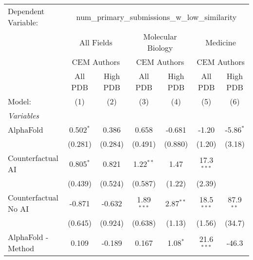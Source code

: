 \begingroup
\centering
\begin{tabular}{lcccccc}
   \tabularnewline \midrule \midrule
   Dependent Variable: & \multicolumn{6}{c}{num\_primary\_submissions\_w\_low\_similarity}\\
 & \multicolumn{2}{c}{All Fields} & \multicolumn{2}{c}{Molecular Biology} & \multicolumn{2}{c}{Medicine} \\
\cmidrule(lr){2-3} \cmidrule(lr){4-5} \cmidrule(lr){6-7}
 & \multicolumn{2}{c}{CEM Authors} & \multicolumn{2}{c}{CEM Authors} & \multicolumn{2}{c}{CEM Authors} \\
\cmidrule(lr){2-3} \cmidrule(lr){4-5} \cmidrule(lr){6-7}
 & \multicolumn{1}{c}{All PDB} & \multicolumn{1}{c}{High PDB} & \multicolumn{1}{c}{All PDB} & \multicolumn{1}{c}{High PDB} & \multicolumn{1}{c}{All PDB} & \multicolumn{1}{c}{High PDB} \\
\cmidrule(lr){2-2} \cmidrule(lr){3-3} \cmidrule(lr){4-4} \cmidrule(lr){5-5} \cmidrule(lr){6-6} \cmidrule(lr){7-7}
   Model:                                                     & (1)          & (2)           & (3)           & (4)           & (5)           & (6)\\  
   \midrule
   \emph{Variables}\\
   AlphaFold                                                  & 0.502$^{*}$  & 0.386         & 0.658         & -0.681        & -1.20         & -5.86$^{*}$\\   
                                                              & (0.281)      & (0.284)       & (0.491)       & (0.880)       & (1.20)        & (3.18)\\   
   Counterfactual AI                                          & 0.805$^{*}$  & 0.821         & 1.22$^{**}$   & 1.47          & 17.3$^{***}$  &   \\   
                                                              & (0.439)      & (0.524)       & (0.587)       & (1.22)        & (2.39)        &   \\   
   Counterfactual No AI                                       & -0.871       & -0.632        & 1.89$^{***}$  & 2.87$^{**}$   & 18.5$^{***}$  & 87.9$^{**}$\\   
                                                              & (0.645)      & (0.924)       & (0.638)       & (1.13)        & (1.56)        & (34.7)\\   
   AlphaFold - Method                                         & 0.109        & -0.189        & 0.167         & 1.08$^{*}$    & 21.6$^{***}$  & -46.3\\   

\end{tabular}
